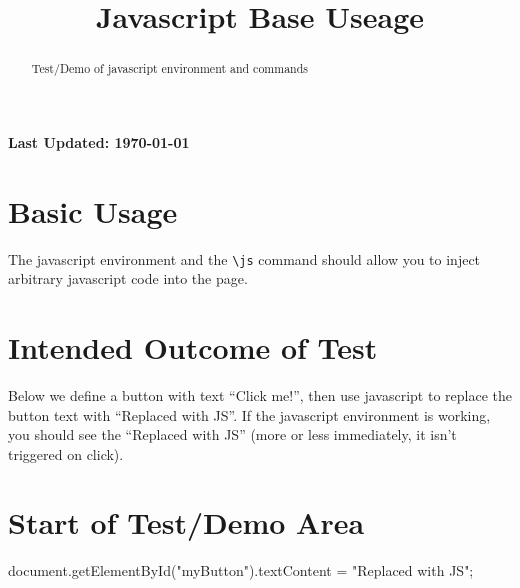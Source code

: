 \documentclass{ximera}
\title{Javascript Base Useage}
\begin{document}
\begin{abstract}
    Test/Demo of javascript environment and commands
\end{abstract}
\maketitle

{{\Huge \bfseries Last Updated: \today}} \\


\section{Basic Usage}
The javascript environment and the \verb|\js| command should allow you to inject arbitrary javascript code into the page.

\section{Intended Outcome of Test}
Below we define a button with text ``Click me!'', then use javascript to replace the button text with ``Replaced with JS''.
If the javascript environment is working, you should see the ``Replaced with JS'' (more or less immediately, it isn't triggered on click).



\section{Start of Test/Demo Area}
\ifdefined\HCode
{}
\fi


\begin{javascript}
document.getElementById("myButton").textContent = "Replaced with JS";
\end{javascript}



\hrulefill
\end{document}
